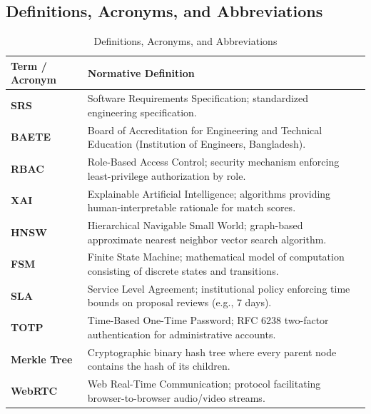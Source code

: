 \documentclass[10.5pt,a4paper]{article}
\begin{document}
\subsection{Definitions, Acronyms, and Abbreviations}

\begin{table}[h]
\centering
\small
\begin{tabularx}{\linewidth}{|l|X|}
\hline
\rowcolor{headergray} \textbf{Term / Acronym} & \textbf{Normative Definition} \\ \hline
\textbf{SRS} & Software Requirements Specification; standardized engineering specification. \\ \hline
\textbf{BAETE} & Board of Accreditation for Engineering and Technical Education (Institution of Engineers, Bangladesh). \\ \hline
\textbf{RBAC} & Role-Based Access Control; security mechanism enforcing least-privilege authorization by role. \\ \hline
\textbf{XAI} & Explainable Artificial Intelligence; algorithms providing human-interpretable rationale for match scores. \\ \hline
\textbf{HNSW} & Hierarchical Navigable Small World; graph-based approximate nearest neighbor vector search algorithm. \\ \hline
\textbf{FSM} & Finite State Machine; mathematical model of computation consisting of discrete states and transitions. \\ \hline
\textbf{SLA} & Service Level Agreement; institutional policy enforcing time bounds on proposal reviews (e.g., 7 days). \\ \hline
\textbf{TOTP} & Time-Based One-Time Password; RFC 6238 two-factor authentication for administrative accounts. \\ \hline
\textbf{Merkle Tree} & Cryptographic binary hash tree where every parent node contains the hash of its children. \\ \hline
\textbf{WebRTC} & Web Real-Time Communication; protocol facilitating browser-to-browser audio/video streams. \\ \hline
\end{tabularx}
\caption{Definitions, Acronyms, and Abbreviations}
\end{table}
\end{document}
